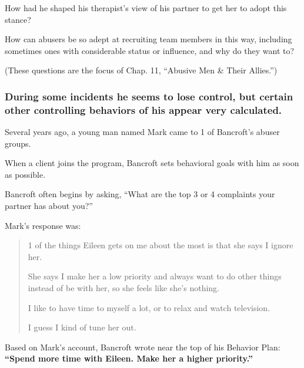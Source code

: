\documentclass[oneside]{article}
\numberwithin{equation}{section}
\begin{document}
How had he shaped his therapist's view of his partner to get her to adopt this stance?

How can abusers be so adept at recruiting team members in this way, including sometimes ones with considerable status or influence, and why do they want to?

(These questions are the focus of Chap. 11, ``Abusive Men \& Their Allies.'')

\subsubsection{During some incidents he seems to lose control, but certain other controlling behaviors of his appear very calculated.}
Several years ago, a young man named Mark came to 1 of Bancroft's abuser groups.

When a client joins the program, Bancroft sets behavioral goals with him as soon as possible.

Bancroft often begins by asking, ``What are the top 3 or 4 complaints your partner has about you?''

Mark's response was:
\begin{quotation}
    1 of the things Eileen gets on me about the most is that she says I ignore her.
    
    She says I make her a low priority and always want to do other things instead of be with her, so she feels like she's nothing.
    
    I like to have time to myself a lot, or to relax and watch television.
    
    I guess I kind of tune her out.
\end{quotation}
Based on Mark's account, Bancroft wrote near the top of his Behavior Plan: \textbf{``Spend more time with Eileen. Make her a higher priority.''}
\end{document}
